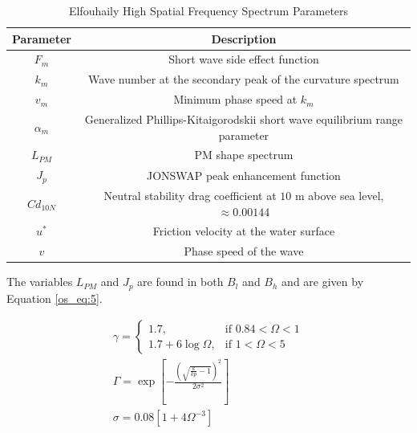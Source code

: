 \begin{table}[H]
  \begin{center}
      \renewcommand{\baselinestretch}{1} \small\normalsize
  \begin{quote}
    \caption[Elfouhaily High Spatial Frequency Spectrum Parameters]{Elfouhaily High Spatial Frequency Spectrum Parameters\label{os_tab:2}}
  \end{quote}
  \begin{tabular} {|c | c |}
    \hline
  \bf{Parameter} & \bf{Description} \\ \hline
  $F_m$ & Short wave side effect function \\ \hline
  $k_m$ &  Wave number at the secondary peak of the curvature spectrum \\ \hline
  $v_m$ &  Minimum phase speed at $k_m$ \\ \hline
  $\alpha_m$ & Generalized Phillips-Kitaigorodskii short wave equilibrium range parameter \\ \hline
  $L_{PM}$ & PM shape spectrum \\ \hline
  $J_p$ & JONSWAP peak enhancement function \\ \hline
  $Cd_{10N}$ & Neutral stability drag coefficient at $10$ m above sea level, $\approx 0.00144$ \\ \hline
  $u^*$ & Friction velocity at the water surface \\ \hline
  $v$ & Phase speed of the wave \\ \hline
\end{tabular}
\end{center}
\end{table}
\renewcommand{\baselinestretch}{2} \small\normalsize

The variables $L_{PM}$ and $J_p$ are found in both $B_l$ and $B_h$ and are given by Equation \ref{os_eq:5}.

\begin{equation}
\begin{gathered}
  \label{os_eq:5}
    \gamma = \begin{cases}
    1.7,& \text{if } 0.84 < \Omega < 1\\
    1.7 + 6\log{\Omega}, & \text{if } 1 < \Omega < 5
  \end{cases} \\
  \Gamma = \exp{\left[- \frac{\left(\sqrt{\frac{k}{kp} - 1} \right)^2}{2\sigma^2} \right]} \\
  \sigma = 0.08\left[1 + 4\Omega^{-3} \right] \\
\end{gathered}
\end{equation}
\renewcommand{\baselinestretch}{2} \small\normalsize

